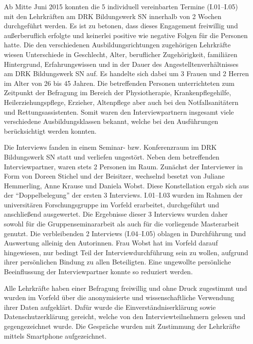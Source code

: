 Ab Mitte Juni 2015 konnten die 5 individuell vereinbarten Termine (I.01--I.05) mit den Lehrkräften am DRK Bildungswerk SN innerhalb von 2 Wochen durchgeführt werden. Es ist zu betonen, dass dieses Engagement freiwillig und außerberuflich erfolgte und keinerlei positive wie negative Folgen für die Personen hatte. Die den verschiedenen Ausbildungsrichtungen zugehörigen Lehrkräfte wiesen Unterschiede in Geschlecht, Alter, beruflicher Zugehörigkeit, familiären Hintergrund, Erfahrungswissen und in der Dauer des Angestelltenverhältnisses am DRK Bildungswerk SN auf. Es handelte sich dabei um 3 Frauen und 2 Herren im Alter von 26 bis 45 Jahren. Die betreffenden Personen unterrichteten zum Zeitpunkt der Befragung im Bereich der Physiotherapie, Krankenpflegehilfe, Heilerziehungspflege, Erzieher, Altenpflege aber auch bei den Notfallsanitätern und Rettungsassistenten. Somit waren den Interviewpartnern insgesamt viele verschiedene Ausbildungsklassen bekannt, welche bei den Ausführungen berücksichtigt werden konnten.

Die Interviews fanden in einem Seminar- bzw. Konferenzraum im DRK Bildungswerk SN statt und verliefen ungestört.
Neben dem betreffenden Interviewpartner, waren stets 2 Personen im Raum. Zunächst der Interviewer in Form von Doreen Stichel und der Beisitzer, wechselnd besetzt von Juliane Hemmerling, Anne Krause und Daniela Wobst. Diese Konstellation ergab sich aus der "`Doppelbelegung"' der ersten 3 Interviews. I.01--I.03 wurden im Rahmen der universitären Forschungsgruppe im Vorfeld erarbeitet, durchgeführt und anschließend ausgewertet. Die Ergebnisse dieser 3 Interviews wurden daher sowohl für die Gruppenseminararbeit als auch für die vorliegende Masterarbeit genutzt. Die verbleibenden 2 Interviews (I.04--I.05) oblagen in Durchführung und Auswertung alleinig den Autorinnen. Frau Wobst hat im Vorfeld darauf hingewiesen, nur bedingt Teil der Interviewdurchführung sein zu wollen, aufgrund ihrer persönlichen Bindung zu allen Beteiligten. Eine ungewollte persönliche Beeinflussung der Interviewpartner konnte so reduziert werden.

Alle Lehrkräfte haben einer Befragung freiwillig und ohne Druck zugestimmt und wurden im Vorfeld über die anonymisierte und wissenschaftliche Verwendung ihrer Daten aufgeklärt. Dafür wurde die Einverständniserklärung sowie Datenschutzerklärung gereicht, welche von den Interviewteilnehmern gelesen und gegengezeichnet wurde. Die Gespräche wurden mit Zustimmung der Lehrkräfte mittels Smartphone aufgezeichnet.  

